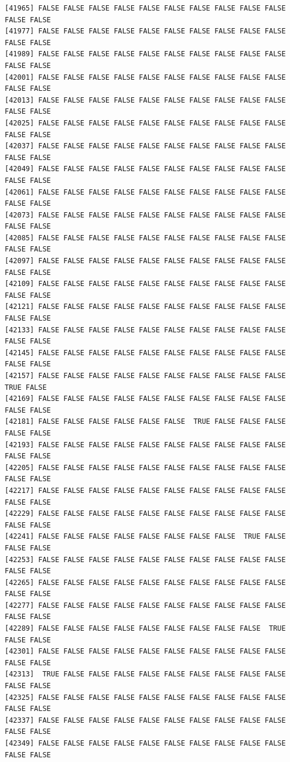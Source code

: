 \documentclass[
  a4paper,
  DIV=11,
  numbers=noendperiod]{scrartcl}
\begin{document}
\begin{verbatim}
[41965] FALSE FALSE FALSE FALSE FALSE FALSE FALSE FALSE FALSE FALSE FALSE FALSE
[41977] FALSE FALSE FALSE FALSE FALSE FALSE FALSE FALSE FALSE FALSE FALSE FALSE
[41989] FALSE FALSE FALSE FALSE FALSE FALSE FALSE FALSE FALSE FALSE FALSE FALSE
[42001] FALSE FALSE FALSE FALSE FALSE FALSE FALSE FALSE FALSE FALSE FALSE FALSE
[42013] FALSE FALSE FALSE FALSE FALSE FALSE FALSE FALSE FALSE FALSE FALSE FALSE
[42025] FALSE FALSE FALSE FALSE FALSE FALSE FALSE FALSE FALSE FALSE FALSE FALSE
[42037] FALSE FALSE FALSE FALSE FALSE FALSE FALSE FALSE FALSE FALSE FALSE FALSE
[42049] FALSE FALSE FALSE FALSE FALSE FALSE FALSE FALSE FALSE FALSE FALSE FALSE
[42061] FALSE FALSE FALSE FALSE FALSE FALSE FALSE FALSE FALSE FALSE FALSE FALSE
[42073] FALSE FALSE FALSE FALSE FALSE FALSE FALSE FALSE FALSE FALSE FALSE FALSE
[42085] FALSE FALSE FALSE FALSE FALSE FALSE FALSE FALSE FALSE FALSE FALSE FALSE
[42097] FALSE FALSE FALSE FALSE FALSE FALSE FALSE FALSE FALSE FALSE FALSE FALSE
[42109] FALSE FALSE FALSE FALSE FALSE FALSE FALSE FALSE FALSE FALSE FALSE FALSE
[42121] FALSE FALSE FALSE FALSE FALSE FALSE FALSE FALSE FALSE FALSE FALSE FALSE
[42133] FALSE FALSE FALSE FALSE FALSE FALSE FALSE FALSE FALSE FALSE FALSE FALSE
[42145] FALSE FALSE FALSE FALSE FALSE FALSE FALSE FALSE FALSE FALSE FALSE FALSE
[42157] FALSE FALSE FALSE FALSE FALSE FALSE FALSE FALSE FALSE FALSE  TRUE FALSE
[42169] FALSE FALSE FALSE FALSE FALSE FALSE FALSE FALSE FALSE FALSE FALSE FALSE
[42181] FALSE FALSE FALSE FALSE FALSE FALSE  TRUE FALSE FALSE FALSE FALSE FALSE
[42193] FALSE FALSE FALSE FALSE FALSE FALSE FALSE FALSE FALSE FALSE FALSE FALSE
[42205] FALSE FALSE FALSE FALSE FALSE FALSE FALSE FALSE FALSE FALSE FALSE FALSE
[42217] FALSE FALSE FALSE FALSE FALSE FALSE FALSE FALSE FALSE FALSE FALSE FALSE
[42229] FALSE FALSE FALSE FALSE FALSE FALSE FALSE FALSE FALSE FALSE FALSE FALSE
[42241] FALSE FALSE FALSE FALSE FALSE FALSE FALSE FALSE  TRUE FALSE FALSE FALSE
[42253] FALSE FALSE FALSE FALSE FALSE FALSE FALSE FALSE FALSE FALSE FALSE FALSE
[42265] FALSE FALSE FALSE FALSE FALSE FALSE FALSE FALSE FALSE FALSE FALSE FALSE
[42277] FALSE FALSE FALSE FALSE FALSE FALSE FALSE FALSE FALSE FALSE FALSE FALSE
[42289] FALSE FALSE FALSE FALSE FALSE FALSE FALSE FALSE FALSE  TRUE FALSE FALSE
[42301] FALSE FALSE FALSE FALSE FALSE FALSE FALSE FALSE FALSE FALSE FALSE FALSE
[42313]  TRUE FALSE FALSE FALSE FALSE FALSE FALSE FALSE FALSE FALSE FALSE FALSE
[42325] FALSE FALSE FALSE FALSE FALSE FALSE FALSE FALSE FALSE FALSE FALSE FALSE
[42337] FALSE FALSE FALSE FALSE FALSE FALSE FALSE FALSE FALSE FALSE FALSE FALSE
[42349] FALSE FALSE FALSE FALSE FALSE FALSE FALSE FALSE FALSE FALSE FALSE FALSE

\end{verbatim}
\end{document}
